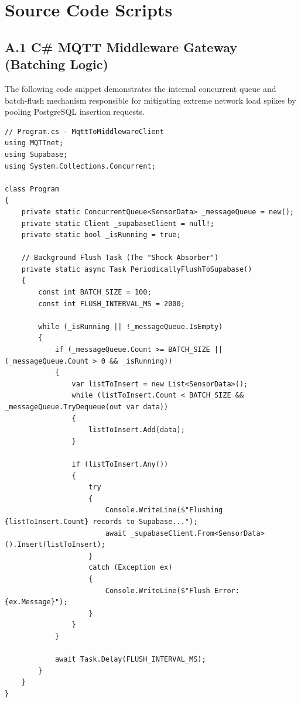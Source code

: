 {}
\section*{Source Code Scripts}

\subsection*{A.1 C\# MQTT Middleware Gateway (Batching Logic)}
The following code snippet demonstrates the internal concurrent queue and batch-flush mechanism responsible for mitigating extreme network load spikes by pooling PostgreSQL insertion requests.

\begin{lstlisting}[language=Csh, caption=Middleware Batched Ingestion Logic (C\#)]
// Program.cs - MqttToMiddlewareClient
using MQTTnet;
using Supabase;
using System.Collections.Concurrent;

class Program
{
    private static ConcurrentQueue<SensorData> _messageQueue = new();
    private static Client _supabaseClient = null!;
    private static bool _isRunning = true;

    // Background Flush Task (The "Shock Absorber")
    private static async Task PeriodicallyFlushToSupabase()
    {
        const int BATCH_SIZE = 100;
        const int FLUSH_INTERVAL_MS = 2000;

        while (_isRunning || !_messageQueue.IsEmpty)
        {
            if (_messageQueue.Count >= BATCH_SIZE || (_messageQueue.Count > 0 && _isRunning))
            {
                var listToInsert = new List<SensorData>();
                while (listToInsert.Count < BATCH_SIZE && _messageQueue.TryDequeue(out var data))
                {
                    listToInsert.Add(data);
                }

                if (listToInsert.Any())
                {
                    try
                    {
                        Console.WriteLine($"Flushing {listToInsert.Count} records to Supabase...");
                        await _supabaseClient.From<SensorData>().Insert(listToInsert);
                    }
                    catch (Exception ex)
                    {
                        Console.WriteLine($"Flush Error: {ex.Message}");
                    }
                }
            }

            await Task.Delay(FLUSH_INTERVAL_MS);
        }
    }
}
\end{lstlisting}

